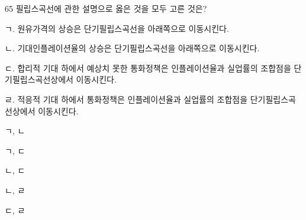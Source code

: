 \begin{question}{65}
필립스곡선에 관한 설명으로 옳은 것을 모두 고른 것은?
\begin{framedtext}
ㄱ. 원유가격의 상승은 단기필립스곡선을 아래쪽으로 이동시킨다. \par
ㄴ. 기대인플레이션율의 상승은 단기필립스곡선을 아래쪽으로 이동시킨다. \par
ㄷ. 합리적 기대 하에서 예상치 못한 통화정책은 인플레이션율과 실업률의 조합점을 단기필립스곡선상에서 이동시킨다. \par
ㄹ. 적응적 기대 하에서 통화정책은 인플레이션율과 실업률의 조합점을 단기필립스곡선상에서 이동시킨다.
\end{framedtext}
\begin{choices}
  \item ㄱ, ㄴ
  \item ㄱ, ㄷ
  \item ㄴ, ㄷ
  \item ㄴ, ㄹ
  \item ㄷ, ㄹ
\end{choices}
\end{question}
